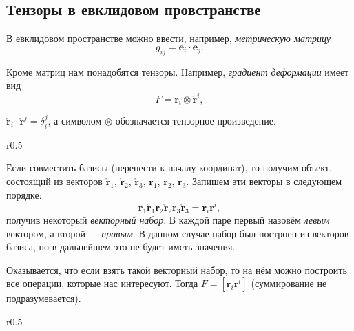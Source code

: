 \subsection{Тензоры в евклидовом провстранстве}
В евклидовом пространстве можно ввести, например, \emph{метрическую
матрицу}
\[
  g_{ij} = \mathbf{e}_i \cdot \mathbf{e}_j.
\]


Кроме матриц нам понадобятся тензоры. Например, \emph{градиент деформации} имеет вид
\[
  F = \mathbf{r}_i \otimes \mathring{\mathbf{r}}^i,
\]
\begin{figure}[H]
	\centering
	
\end{figure}
 $\mathring{\mathbf{r}}_i \cdot \mathring{\mathbf{r}}^j = \delta_i^j$, а
символом
  $\otimes$ обозначается тензорное произведение.
  

\begin{wrapfigure}{r}{0.5\textwidth}
	\centering
	
\end{wrapfigure}

Если совместить базисы (перенести к началу координат), то получим объект, состоящий
из векторов $\mathring{\mathbf{r}}_1$, $\mathring{\mathbf{r}}_2$, $\mathring{\mathbf{r}}_3$, $\mathbf{r}_1$,
$\mathbf{r}_2$, $\mathbf{r}_3$. Запишем эти векторы в следующем порядке:
\[
  \mathbf{r}_1 \mathring{\mathbf{r}}_1 \mathbf{r}_2 \mathring{\mathbf{r}}_2 \mathbf{r}_3 \mathring{\mathbf{r}}_3 = \mathbf{r}_i \mathbf{r}^i,
\]
получив некоторый \emph{векторный набор}. В каждой паре первый назовём \emph{левым} вектором, а
второй --- \emph{правым}. В данном случае набор был построен из векторов базиса,
но в дальнейшем это не будет иметь значения.

%	

Оказывается, что если взять такой векторный набор, то на нём можно построить все операции, которые
нас интересуют. Тогда $F = [\mathbf{r}_i \mathbf{r}^i]$ (суммирование не подразумевается).

\begin{wrapfigure}{r}{0.5\textwidth}
	\centering
	
\end{wrapfigure}


